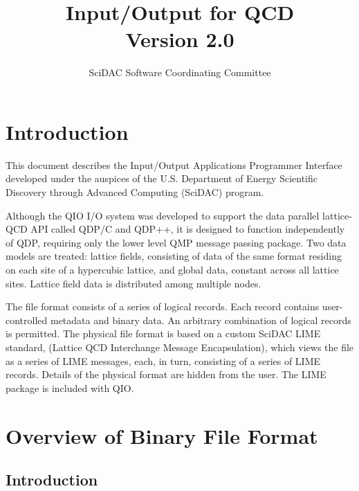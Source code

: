 \documentclass{article}
\begin{document}
\title{
   Input/Output for QCD \\{\large Version 2.0}
}
\author{ SciDAC Software Coordinating Committee}

\maketitle
\section{Introduction}
This document describes the Input/Output Applications Programmer
Interface developed under the auspices of the U.S. Department of
Energy Scientific Discovery through Advanced Computing (SciDAC)
program.

Although the QIO I/O system was developed to support the data parallel
lattice-QCD API called QDP/C and QDP++, it is designed to function
independently of QDP, requiring only the lower level QMP message
passing package.  Two data models are treated: lattice fields,
consisting of data of the same format residing on each site of a
hypercubic lattice, and global data, constant across all lattice
sites.  Lattice field data is distributed among multiple nodes.

The file format consists of a series of logical records.  Each record
contains user-controlled metadata and binary data.  An arbitrary
combination of logical records is permitted.  The physical file format
is based on a custom SciDAC LIME standard, (Lattice QCD Interchange
Message Encapsulation), which views the file as a series of LIME
messages, each, in turn, consisting of a series of LIME records.
Details of the physical format are hidden from the user.  The LIME
package is included with QIO.

\section{Overview of Binary File Format}
\label{sec.fileformat}

\subsection{Introduction}
\end{document}
